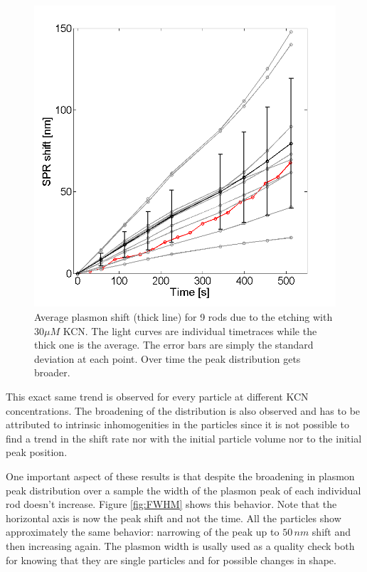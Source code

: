 \documentclass[twocolumn]{article}
\begin{document}
\begin{figure}[hbt]
 \centering
 \includegraphics[width=0.95\linewidth]{plasmon_average.png}
 \caption{Average plasmon shift (thick line) for 9 rods due to the etching with
 $30\mu M$ KCN. The light curves are individual timetraces while the thick one is the
 average. The error bars are simply the standard deviation at each point. Over
 time the peak distribution gets broader.}
 \label{fig:plasmon_average}
\end{figure}

This exact same trend is observed for every particle at different KCN
concentrations. The broadening of the distribution is also observed and has to
be attributed to intrinsic inhomogenities in the particles since it is not
possible to find a trend in the shift rate nor with the initial particle 
volume nor to the initial peak position. 

One important aspect of these results is that despite the broadening in plasmon
peak distribution over a sample the width of the plasmon peak of each individual
rod doesn't increase. Figure \ref{fig:FWHM} shows this behavior. Note that the
horizontal axis is now the peak shift and not the time. All the particles show
approximately the same behavior: narrowing of the peak up to $50\,nm$ shift and
then increasing again. The plasmon width is usally used as a quality check both
for knowing that they are single particles and for possible changes in shape.
\end{document}
